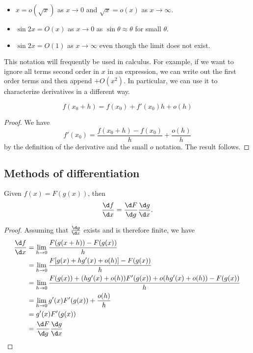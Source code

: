 \documentclass[a4paper]{article}
\begin{document}
\begin{eg}\leavevmode
  \begin{itemize}
    \item $x=o(\sqrt{x})$ as $x\to 0$ and $\sqrt{x} = o(x)$ as $x\to \infty$.
    \item $\sin 2x = O(x)$ as $x\to 0$ as $\sin \theta \approx \theta$ for small $\theta$.
    \item $\sin 2x = O(1)$ as $x\to \infty$ even though the limit does not exist.
  \end{itemize}
\end{eg}

This notation will frequently be used in calculus. For example, if we want to ignore all terms second order in $x$ in an expression, we can write out the first order terms and then append $+O(x^2)$. In particular, we can use it to characterize derivatives in a different way.
\begin{prop}
  \[
    f(x_0 + h) = f(x_0) + f'(x_0)h + o(h)
  \]
\end{prop}

\begin{proof}
  We have
  \[
    f'(x_0) = \frac{f(x_0 + h) - f(x_0)}{h} + \frac{o(h)}{h}
  \]
  by the definition of the derivative and the small $o$ notation. The result follows.
\end{proof}

\subsection{Methods of differentiation}
\begin{thm}
  Given $f(x) = F(g(x))$, then
  \[
    \frac{\d f}{\d x} = \frac{\d F}{\d g}\frac{\d g}{\d x}.
  \]
\end{thm}

\begin{proof}
  Assuming that $\frac{\d g}{\d x}$ exists and is therefore finite, we have
  \begin{align*}
    \frac{\d f}{\d x} &= \lim_{h\to 0}\frac{F(g(x + h)) - F(g(x))}{h}\\
    &= \lim_{h\to 0}\frac{F[g(x) + hg'(x) + o(h)] - F(g(x))}{h}\\
    &= \lim_{h\to 0}\frac{F(g(x)) + (hg'(x) + o(h))F'(g(x)) + o(hg'(x) + o(h)) - F(g(x))}{h}\\
    &= \lim_{h\to 0}g'(x)F'(g(x)) + \frac{o(h)}{h}\\
    &= g'(x)F'(g(x))\\
    &= \frac{\d F}{\d g}\frac{\d g}{\d x}
  \end{align*}
\end{proof}
\end{document}
